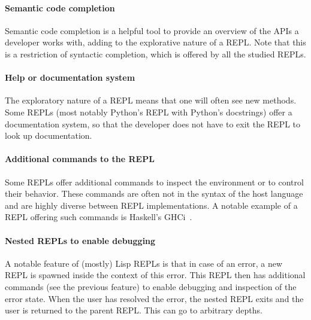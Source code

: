 \paragraph{Semantic code completion} Semantic code completion is a helpful tool
to provide an overview of the APIs a developer works with, adding to
the explorative nature of a REPL. Note that this is a restriction of syntactic
completion, which is offered by all the studied REPLs.

\paragraph{Help or documentation system} The exploratory nature of a REPL means
that one will often see new methods. Some REPLs (most notably Python's REPL with
Python's docstrings) offer a documentation system, so that the developer does
not have to exit the REPL to look up documentation.

\paragraph{Additional commands to the REPL} Some REPLs offer additional commands
to inspect the environment or to control their behavior. These commands are
often not in the syntax of the host language and are highly diverse between REPL
implementations. A notable example of a REPL offering such commands is Haskell's
GHCi~\cite{GHCi-commands}.

\paragraph{Nested REPLs to enable debugging} A notable feature of (mostly) Lisp
REPLs is that in case of an error, a new REPL is spawned inside the context of
this error. This REPL then has additional commands (see the previous feature) to
enable debugging and inspection of the error state. When the user has
resolved the error, the nested REPL exits and the user is returned to the
parent REPL. This can go to arbitrary depths.

